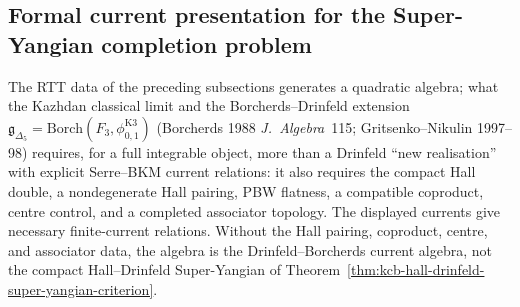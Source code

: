 \subsection{Formal current presentation for the Super-Yangian completion problem}
\label{subsec:kcb-super-yangian-explicit}

The RTT data of the preceding subsections generates a quadratic
algebra; what the Kazhdan classical limit and the Borcherds--Drinfeld
extension $\mathfrak{g}_{\Delta_5}=\mathrm{Borch}(F_3,\phi_{0,1}^{\mathrm{K3}})$
(Borcherds 1988 \emph{J.~Algebra}~115; Gritsenko--Nikulin 1997--98)
requires, for a full integrable object, more than a Drinfeld
``new realisation'' with explicit Serre--BKM current relations:
it also requires the compact Hall double, a nondegenerate Hall pairing,
PBW flatness, a compatible coproduct, centre control, and a completed
associator topology. The displayed currents give necessary finite-current
relations. Without the Hall pairing, coproduct, centre, and associator
data, the algebra is the Drinfeld--Borcherds current algebra, not the
compact Hall--Drinfeld Super-Yangian of
Theorem~\ref{thm:kcb-hall-drinfeld-super-yangian-criterion}.

